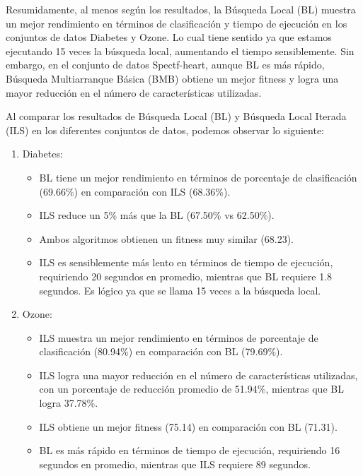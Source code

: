Resumidamente, al menos según los resultados, la Búsqueda Local (BL) muestra un mejor rendimiento en términos de clasificación y tiempo de ejecución en los conjuntos de datos Diabetes y Ozone. Lo cual tiene sentido ya que estamos ejecutando 15 veces la búsqueda local, aumentando el tiempo sensiblemente. Sin embargo, en el conjunto de datos Spectf-heart, aunque BL es más rápido, Búsqueda Multiarranque Básica (BMB) obtiene un mejor fitness y logra una mayor reducción en el número de características utilizadas.



Al comparar los resultados de Búsqueda Local (BL) y Búsqueda Local Iterada (ILS) en los diferentes conjuntos de datos, podemos observar lo siguiente:

\begin{enumerate}
	
\item Diabetes:

\begin{itemize}
\item BL tiene un mejor rendimiento en términos de porcentaje de clasificación (69.66\%) en comparación con ILS (68.36\%).
\item  ILS reduce un 5\% más que la BL (67.50\% vs 62.50\%).
\item  Ambos algoritmos obtienen un fitness muy similar (68.23).
\item  ILS es sensiblemente más lento en términos de tiempo de ejecución, requiriendo 20 segundos en promedio, mientras que BL requiere 1.8 segundos. Es lógico ya que se llama 15 veces a la búsqueda local.
\end{itemize}

\item Ozone:

\begin{itemize}
	\item ILS muestra un mejor rendimiento en términos de porcentaje de clasificación (80.94\%) en comparación con BL (79.69\%).
 \item ILS logra una mayor reducción en el número de características utilizadas, con un porcentaje de reducción promedio de 51.94\%, mientras que BL logra 37.78\%.
 \item ILS obtiene un mejor fitness (75.14) en comparación con BL (71.31).
 \item BL es más rápido en términos de tiempo de ejecución, requiriendo 16 segundos en promedio, mientras que ILS requiere 89 segundos.
\end{itemize}


\end{enumerate}
